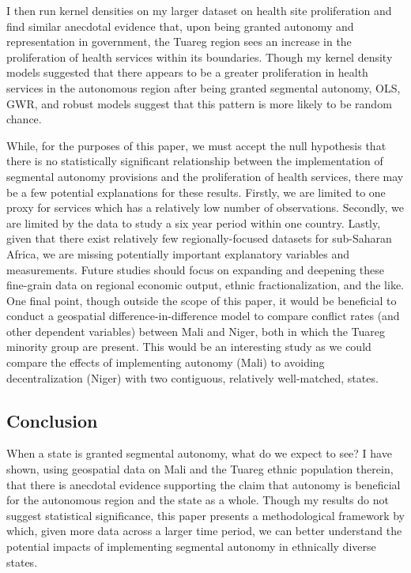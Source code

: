 \documentclass[12pt]{elsarticle}
\begin{document}
I then run kernel densities on my larger dataset on health site proliferation and find similar anecdotal evidence that, upon being granted autonomy and representation in government, the Tuareg region sees an increase in the proliferation of health services within its boundaries. Though my kernel density models suggested that there appears to be a greater proliferation in health services in the autonomous region after being granted segmental autonomy, OLS, GWR, and robust models suggest that this pattern is more likely to be random chance. 

While, for the purposes of this paper, we must accept the null hypothesis that there is no statistically significant relationship between the implementation of segmental autonomy provisions and the proliferation of health services, there may be a few potential explanations for these results. Firstly, we are limited to one proxy for services which has a relatively low number of observations. Secondly, we are limited by the data to study a six year period within one country. Lastly, given that there exist relatively few regionally-focused datasets for sub-Saharan Africa, we are missing potentially important explanatory variables and measurements. Future studies should focus on expanding and deepening these fine-grain data on regional economic output, ethnic fractionalization, and the like. One final point, though outside the scope of this paper, it would be beneficial to conduct a geospatial difference-in-difference model to compare conflict rates (and other dependent variables) between Mali and Niger, both in which the Tuareg minority group are present. This would be an interesting study as we could compare the effects of implementing autonomy (Mali) to avoiding decentralization (Niger) with two contiguous, relatively well-matched, states. 

\subsection{Conclusion}
When a state is granted segmental autonomy, what do we expect to see? I have shown, using geospatial data on Mali and the Tuareg ethnic population therein, that there is anecdotal evidence supporting the claim that autonomy is beneficial for the autonomous region and the state as a whole. Though my results do not suggest statistical significance, this paper presents a methodological framework by which, given more data across a larger time period, we can better understand the potential impacts of implementing segmental autonomy in ethnically diverse states.
\end{document}
